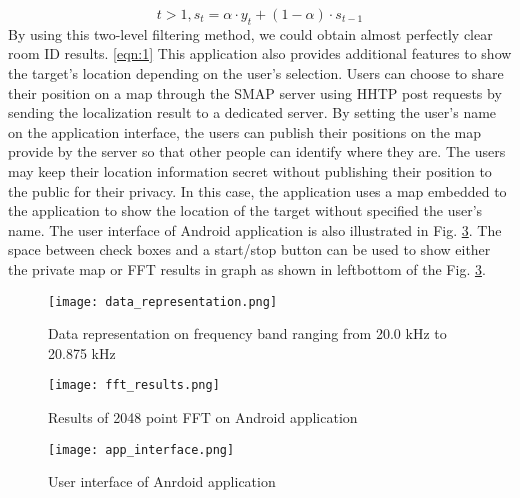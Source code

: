 \begin{equation}
t>1, s_t=\alpha \cdot y_t+(1-\alpha)\cdot s_{t-1}
\label{eqn:1}
\end{equation}
By using this two-level filtering method, we could obtain almost perfectly clear room ID results.
\ref{eqn:1}
This application also provides additional features to show the target’s location depending on the user’s selection. Users can choose to share their position on a map through the SMAP server using HHTP post requests by sending the localization result to a dedicated server. By setting the user’s name on the application interface, the users can publish their positions on the map provide by the server so that other people can identify where they are. The users may keep their location information secret without publishing their position to the public for their privacy. In this case, the application uses a map embedded to the application to show the location of the target without specified the user’s name. The user interface of Android application is also illustrated in Fig. \ref{fig:app_interface}. The space between check boxes and a start/stop button can be used to show either the private map or FFT results in graph as shown in leftbottom of the Fig. \ref{fig:app_interface}.

\begin{figure}
  \centering
  \texttt{[image: data\_representation.png]}
  \caption{Data representation on frequency band ranging from 20.0 kHz to 20.875 kHz}
  \label{fig:data_representation}
\end{figure}

\begin{figure}
  \centering
  \texttt{[image: fft\_results.png]}
  \caption{Results of 2048 point FFT on Android application}
  \label{fig:fft_results}
\end{figure}

\begin{figure}
  \centering
  \texttt{[image: app\_interface.png]}
  \caption{User interface of Anrdoid application}
  \label{fig:app_interface}
\end{figure}


